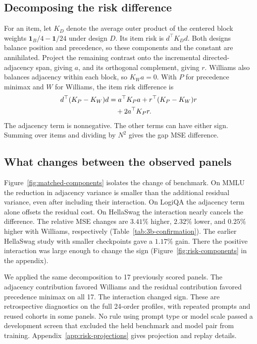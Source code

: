 \documentclass{article}
\begin{document}
\subsection{Decomposing the risk difference}
For an item, let $K_D$ denote the average outer product of the
centered block weights $\mathbf{1}_{B}/4-\mathbf{1}/24$ under design
$D$. Its item risk is $d^\top K_D d$. Both designs balance position
and precedence, so these components and the constant are annihilated.
Project the remaining contrast onto the incremental directed-adjacency
span, giving $a$, and its orthogonal complement, giving $r$. Williams
also balances adjacency within each block, so $K_Wa=0$. With $P$ for
precedence minimax and $W$ for Williams, the item risk difference is
\begin{align}
d^\top(K_P-K_W)d
  &= a^\top K_Pa + r^\top(K_P-K_W)r \notag\\
  &\quad + 2a^\top K_Pr .
\label{eq:risk-components}
\end{align}
The adjacency term is nonnegative. The other terms can have either
sign. Summing over items and dividing by $N^2$ gives the gap MSE difference.

\subsection{What changes between the observed panels}
Figure~\ref{fig:matched-components} isolates the change of benchmark.
On MMLU the reduction in adjacency variance is smaller than the
additional residual variance, even after including their interaction.
On LogiQA the adjacency term alone offsets the residual cost. On
HellaSwag the interaction nearly cancels the difference. The relative
MSE changes are $3.41\%$ higher, $2.32\%$ lower, and $0.25\%$ higher
with Williams, respectively (Table~\ref{tab:3b-confirmation}).
The earlier HellaSwag study with smaller checkpoints gave a $1.17\%$
gain. There the positive interaction was large enough to change the
sign (Figure~\ref{fig:risk-components} in the appendix).

We applied the same decomposition to 17 previously scored panels.
The adjacency contribution favored Williams and the residual
contribution favored precedence minimax on all 17. The interaction
changed sign. These are retrospective diagnostics on the full 24-order
profiles, with repeated prompts and reused cohorts in some panels.
No rule using prompt type or model scale passed a development screen
that excluded the held benchmark and model pair from training.
Appendix~\ref{app:risk-projections} gives projection and replay details.
\end{document}
